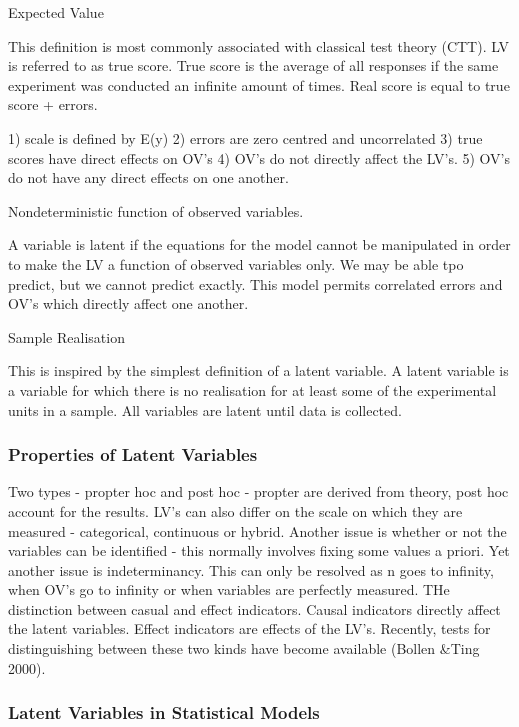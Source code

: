Expected Value

This definition is most commonly associated with classical test theory (CTT). LV is referred to as true score. 
True score is the average of all responses if the same experiment was conducted an infinite amount of times.
Real score is equal to true score + errors.

1) scale is defined by E(y)
2) errors are zero centred and uncorrelated
3) true scores have direct effects on OV's
4) OV's do not directly affect the LV's.
5) OV's do not have any direct effects on one another.

Nondeterministic function of observed variables.

A variable is latent if the equations for the model cannot be manipulated in order to make the LV a function of observed variables only. 
We may be able tpo predict, but we cannot predict exactly.
This model permits correlated errors and OV's which directly affect one another. 

Sample Realisation

This is inspired by the simplest definition of a latent variable.
A latent variable is a variable for which there is no realisation for at least some of the experimental units in a sample.
All variables are latent until data is collected.

\subsubsection{Properties of Latent Variables}

Two types - propter hoc and post hoc - propter are derived from theory, post hoc account for the results.
LV's can also differ on the scale on which they are measured - categorical, continuous or hybrid. 
Another issue is whether or not the variables can be identified - this normally involves fixing some values a priori.
Yet another issue is indeterminancy. This can only be resolved as n goes to infinity, when OV's go to infinity or when variables are perfectly measured. 
THe distinction between casual and effect indicators.
Causal indicators directly affect the latent variables.
Effect indicators are effects of the LV's.
Recently, tests for distinguishing between these two kinds have become available (Bollen \&Ting 2000).

\subsubsection{Latent Variables in Statistical Models}

